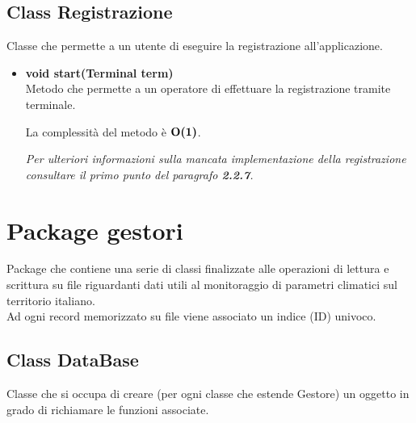 \documentclass[a4paper, 12pt]{scrreprt}
\begin{document}
			\subsection{Class Registrazione}
			Classe che permette a un utente di eseguire la registrazione all'applicazione.
			\begin{itemize}
				\item \textbf{void start(Terminal term)}
				\\Metodo che permette a un operatore di effettuare la registrazione tramite terminale.

				La complessit\`a del metodo \`e $\mathbf{O}\textbf{(1)}$.

				\textsl{Per ulteriori informazioni sulla mancata implementazione della registrazione consultare il primo punto del paragrafo \textbf{2.2.7}.}

			\end{itemize}
		\pagebreak
		\section{Package gestori}
		Package che contiene una serie di classi finalizzate alle operazioni di lettura e scrittura su file riguardanti dati utili al monitoraggio di parametri climatici sul territorio italiano.\\
		Ad ogni record memorizzato su file viene associato un indice (ID) univoco.
			\subsection{Class DataBase}
			Classe che si occupa di creare (per ogni classe che estende Gestore) un oggetto in grado di richiamare le funzioni associate.
\end{document}
